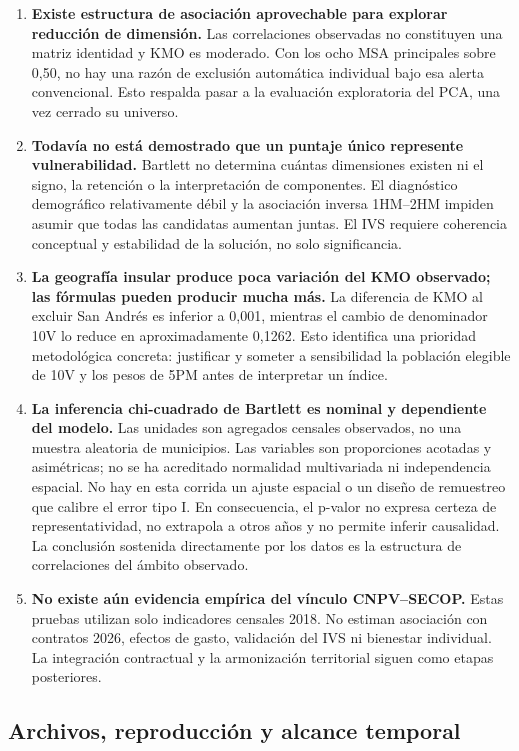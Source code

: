 \begin{enumerate}[leftmargin=1.27cm]
\item \textbf{Existe estructura de asociación aprovechable para explorar reducción de dimensión.} Las correlaciones observadas no constituyen una matriz identidad y KMO es moderado. Con los ocho MSA principales sobre 0,50, no hay una razón de exclusión automática individual bajo esa alerta convencional. Esto respalda pasar a la evaluación exploratoria del PCA, una vez cerrado su universo.
\item \textbf{Todavía no está demostrado que un puntaje único represente vulnerabilidad.} Bartlett no determina cuántas dimensiones existen ni el signo, la retención o la interpretación de componentes. El diagnóstico demográfico relativamente débil y la asociación inversa 1HM--2HM impiden asumir que todas las candidatas aumentan juntas. El IVS requiere coherencia conceptual y estabilidad de la solución, no solo significancia.
\item \textbf{La geografía insular produce poca variación del KMO observado; las fórmulas pueden producir mucha más.} La diferencia de KMO al excluir San Andrés es inferior a 0,001, mientras el cambio de denominador 10V lo reduce en aproximadamente 0,1262. Esto identifica una prioridad metodológica concreta: justificar y someter a sensibilidad la población elegible de 10V y los pesos de 5PM antes de interpretar un índice.
\item \textbf{La inferencia chi-cuadrado de Bartlett es nominal y dependiente del modelo.} Las unidades son agregados censales observados, no una muestra aleatoria de municipios. Las variables son proporciones acotadas y asimétricas; no se ha acreditado normalidad multivariada ni independencia espacial. No hay en esta corrida un ajuste espacial o un diseño de remuestreo que calibre el error tipo I. En consecuencia, el p-valor no expresa certeza de representatividad, no extrapola a otros años y no permite inferir causalidad. La conclusión sostenida directamente por los datos es la estructura de correlaciones del ámbito observado.
\item \textbf{No existe aún evidencia empírica del vínculo CNPV--SECOP.} Estas pruebas utilizan solo indicadores censales 2018. No estiman asociación con contratos 2026, efectos de gasto, validación del IVS ni bienestar individual. La integración contractual y la armonización territorial siguen como etapas posteriores.
\end{enumerate}

\subsection{Archivos, reproducción y alcance temporal}

